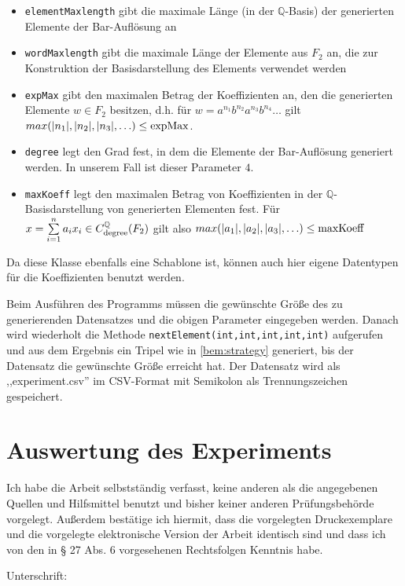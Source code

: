 \documentclass[a4paper,twoside,10pt]{scrreprt}
\newcommand{\Q}{\mathbb{Q}}
\theoremstyle{definition}
\begin{document}
\begin{itemize}
\begin{itemize}
\item \lstinline|elementMaxlength| gibt die maximale Länge (in der $\Q$-Basis) der generierten Elemente der Bar-Auflösung an
\item \lstinline|wordMaxlength| gibt die maximale Länge der Elemente aus $F_2$ an, die zur Konstruktion der Basisdarstellung des Elements verwendet werden
\item \lstinline|expMax| gibt den maximalen Betrag der Koeffizienten an, den die generierten Elemente $w\in F_2$ besitzen, d.h. für $w=a^{n_1}b^{n_2}a^{n_3}b^{n_4}\ldots$ gilt $max(|n_1|,|n_2|,\\|n_3|,\ldots)\leq \text{\lstinline|expMax|}$.
\item \lstinline|degree| legt den Grad fest, in dem die Elemente der Bar-Auflösung generiert werden. In unserem Fall ist dieser Parameter $4$.
\item \lstinline|maxKoeff| legt den maximalen Betrag von Koeffizienten in der $\Q$-Basis\-darstellung von generierten Elementen fest. Für $x=\sum\limits_{i=1}^na_ix_i\in C_{\text{\lstinline|degree|}}^{\Q}(F_2)$ gilt also $max(|a_1|,|a_2|,|a_3|,\ldots)\leq \text{\lstinline|maxKoeff|}$
\end{itemize}
Da diese Klasse ebenfalls eine Schablone ist, können auch hier eigene Datentypen für die Koeffizienten benutzt werden.
\end{itemize}
Beim Ausführen des Programms müssen die gewünschte Größe des zu generierenden Datensatzes und die obigen Parameter eingegeben werden. Danach wird wiederholt die Methode \lstinline|nextElement(int,int,int,int,int)| aufgerufen und aus dem Ergebnis ein Tripel wie in \cref{bem:strategy} generiert, bis der Datensatz die gewünschte Größe erreicht hat. Der Datensatz wird als ,,experiment.csv'' im CSV-Format mit Semikolon als Trennungszeichen gespeichert.
\chapter{Auswertung des Experiments}
\nocite{loeha}
\nocite{loehb}
\nocite{frigerio}
\printbibliography
\newpage
\cleardoublepage
\pagestyle{empty}
\noindent
Ich habe die Arbeit selbstständig verfasst, keine anderen als die angegebenen Quellen und Hilfsmittel benutzt und bisher keiner anderen Prüfungsbehörde vorgelegt. Außerdem bestätige ich hiermit, dass die vorgelegten Druckexemplare und die vorgelegte elektronische Version der Arbeit identisch sind und dass ich von den in § 27 Abs. 6 vorgesehenen Rechtsfolgen Kenntnis habe.\par\hfill\par\noindent
Unterschrift:\hspace{0.5cm} \makebox[1.5in]{\hrulefill}
\end{document}
